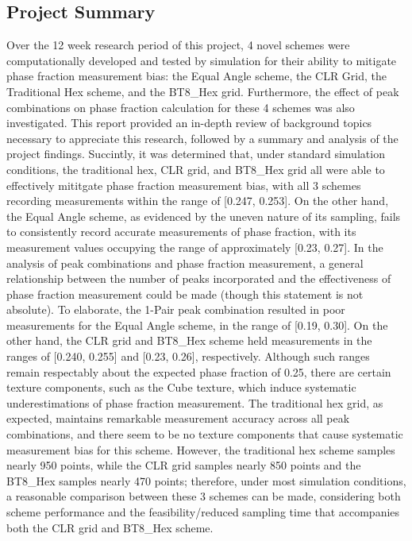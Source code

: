 \documentclass[10pt]{article}
\begin{document}
\subsection{Project Summary}
Over the 12 week research period of this project, 4 novel schemes were computationally developed and tested by simulation for their ability to mitigate 
phase fraction measurement bias: the Equal Angle scheme, the CLR Grid, the Traditional Hex scheme, and the BT8\_Hex grid. Furthermore, 
the effect of peak combinations on phase fraction calculation for these 4 schemes was also investigated. This report provided an in-depth review of background topics 
necessary to appreciate this research, followed by a summary and analysis of the project findings. Succintly, it was determined that, under 
standard simulation conditions, the traditional hex, CLR grid, and BT8\_Hex grid all were able to effectively mititgate phase fraction measurement bias, 
with all 3 schemes recording measurements within the range of [0.247, 0.253]. On the other hand, the Equal Angle scheme, as evidenced by the 
uneven nature of its sampling, fails to consistently record accurate measurements of phase fraction, with its measurement values occupying the 
range of approximately [0.23, 0.27]. In the analysis of peak combinations and phase fraction measurement, a general relationship between the 
number of peaks incorporated and the effectiveness of phase fraction measurement could be made (though this statement is not absolute). To elaborate, 
the 1-Pair peak combination resulted in poor measurements for the Equal Angle scheme, in the range of [0.19, 0.30]. On the other hand, the CLR grid and BT8\_Hex scheme held measurements in the 
ranges of [0.240, 0.255] and [0.23, 0.26], respectively. Although such ranges remain respectably about the expected phase fraction of 0.25, 
there are certain texture components, such as the Cube texture, which induce systematic underestimations of phase fraction measurement. The 
traditional hex grid, as expected, maintains remarkable measurement accuracy across all peak combinations, and there seem to be no texture components that cause
systematic measurement bias for this scheme. However, the traditional hex scheme samples nearly 950 points, while the CLR grid samples nearly 850 points 
and the BT8\_Hex samples nearly 470 points; therefore, under most simulation conditions, a reasonable comparison between these 3 schemes can be made, considering both 
scheme performance and the feasibility/reduced sampling time that accompanies both the CLR grid and BT8\_Hex scheme.
\end{document}
